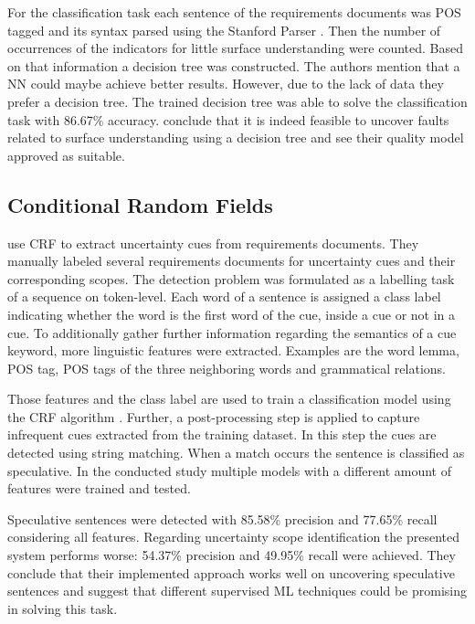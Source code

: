 For the classification task each sentence of the requirements documents was \ac{POS} tagged and its syntax parsed using the Stanford Parser \parencite{Klein:2002}.
Then the number of occurrences of the indicators for little surface understanding were counted.
Based on that information a decision tree was constructed.
The authors mention that a \ac{NN} could maybe achieve better results.
However, due to the lack of data they prefer a decision tree.
The trained decision tree was able to solve the classification task with 86.67\% accuracy.
\textcite{Ormandjieva:2007} conclude that it is indeed feasible to uncover faults related to surface understanding using a decision tree and see their quality model approved as suitable.

\subsection{Conditional Random Fields}
\textcite{Yang:2012} use \ac{CRF} to extract uncertainty cues from requirements documents.
They manually labeled several requirements documents for uncertainty cues and their corresponding scopes.
The detection problem was formulated as a labelling task of a sequence on token-level.
Each word of a sentence is assigned a class label indicating whether the word is the first word of the cue, inside a cue or not in a cue.
To additionally gather further information regarding the semantics of a cue keyword, more linguistic features were extracted.
Examples are the word lemma, \ac{POS} tag, \ac{POS} tags of the three neighboring words and grammatical relations.

Those features and the class label are used to train a classification model using the \ac{CRF} algorithm \parencite{Lafferty:2001}.
Further, a post-processing step is applied to capture infrequent cues extracted from the training dataset.
In this step the cues are detected using string matching.
When a match occurs the sentence is classified as speculative.
In the conducted study multiple models with a different amount of features were trained and tested.

Speculative sentences were detected with 85.58\% precision and 77.65\% recall considering all features.
Regarding uncertainty scope identification the presented system performs worse: 54.37\% precision and 49.95\% recall were achieved.
They conclude that their implemented approach works well on uncovering speculative sentences and suggest that different supervised \ac{ML} techniques could be promising in solving this task.

